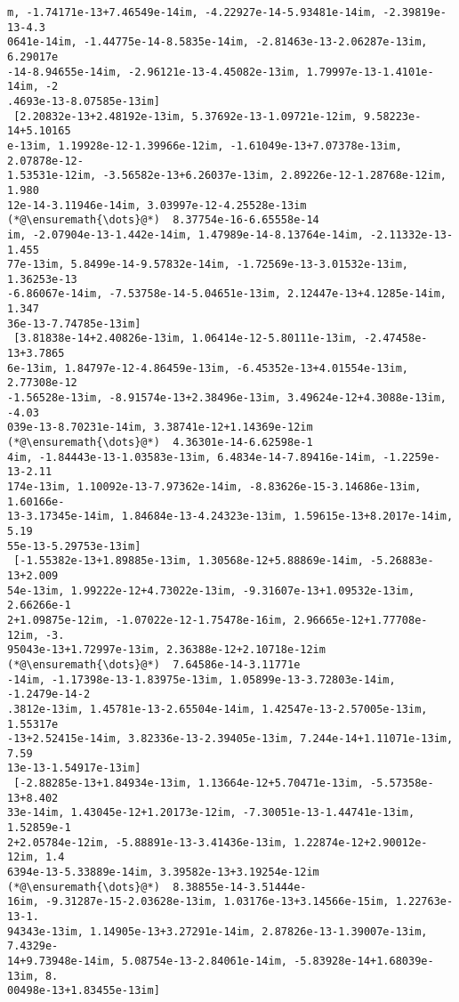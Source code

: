 \documentclass[12pt,a4paper]{article}
\begin{document}
\begin{lstlisting}
m, -1.74171e-13+7.46549e-14im, -4.22927e-14-5.93481e-14im, -2.39819e-13-4.3
0641e-14im, -1.44775e-14-8.5835e-14im, -2.81463e-13-2.06287e-13im, 6.29017e
-14-8.94655e-14im, -2.96121e-13-4.45082e-13im, 1.79997e-13-1.4101e-14im, -2
.4693e-13-8.07585e-13im]     
 [2.20832e-13+2.48192e-13im, 5.37692e-13-1.09721e-12im, 9.58223e-14+5.10165
e-13im, 1.19928e-12-1.39966e-12im, -1.61049e-13+7.07378e-13im, 2.07878e-12-
1.53531e-12im, -3.56582e-13+6.26037e-13im, 2.89226e-12-1.28768e-12im, 1.980
12e-14-3.11946e-14im, 3.03997e-12-4.25528e-13im  (*@\ensuremath{\dots}@*)  8.37754e-16-6.65558e-14
im, -2.07904e-13-1.442e-14im, 1.47989e-14-8.13764e-14im, -2.11332e-13-1.455
77e-13im, 5.8499e-14-9.57832e-14im, -1.72569e-13-3.01532e-13im, 1.36253e-13
-6.86067e-14im, -7.53758e-14-5.04651e-13im, 2.12447e-13+4.1285e-14im, 1.347
36e-13-7.74785e-13im]        
 [3.81838e-14+2.40826e-13im, 1.06414e-12-5.80111e-13im, -2.47458e-13+3.7865
6e-13im, 1.84797e-12-4.86459e-13im, -6.45352e-13+4.01554e-13im, 2.77308e-12
-1.56528e-13im, -8.91574e-13+2.38496e-13im, 3.49624e-12+4.3088e-13im, -4.03
039e-13-8.70231e-14im, 3.38741e-12+1.14369e-12im  (*@\ensuremath{\dots}@*)  4.36301e-14-6.62598e-1
4im, -1.84443e-13-1.03583e-13im, 6.4834e-14-7.89416e-14im, -1.2259e-13-2.11
174e-13im, 1.10092e-13-7.97362e-14im, -8.83626e-15-3.14686e-13im, 1.60166e-
13-3.17345e-14im, 1.84684e-13-4.24323e-13im, 1.59615e-13+8.2017e-14im, 5.19
55e-13-5.29753e-13im]        
 [-1.55382e-13+1.89885e-13im, 1.30568e-12+5.88869e-14im, -5.26883e-13+2.009
54e-13im, 1.99222e-12+4.73022e-13im, -9.31607e-13+1.09532e-13im, 2.66266e-1
2+1.09875e-12im, -1.07022e-12-1.75478e-16im, 2.96665e-12+1.77708e-12im, -3.
95043e-13+1.72997e-13im, 2.36388e-12+2.10718e-12im  (*@\ensuremath{\dots}@*)  7.64586e-14-3.11771e
-14im, -1.17398e-13-1.83975e-13im, 1.05899e-13-3.72803e-14im, -1.2479e-14-2
.3812e-13im, 1.45781e-13-2.65504e-14im, 1.42547e-13-2.57005e-13im, 1.55317e
-13+2.52415e-14im, 3.82336e-13-2.39405e-13im, 7.244e-14+1.11071e-13im, 7.59
13e-13-1.54917e-13im]        
 [-2.88285e-13+1.84934e-13im, 1.13664e-12+5.70471e-13im, -5.57358e-13+8.402
33e-14im, 1.43045e-12+1.20173e-12im, -7.30051e-13-1.44741e-13im, 1.52859e-1
2+2.05784e-12im, -5.88891e-13-3.41436e-13im, 1.22874e-12+2.90012e-12im, 1.4
6394e-13-5.33889e-14im, 3.39582e-13+3.19254e-12im  (*@\ensuremath{\dots}@*)  8.38855e-14-3.51444e-
16im, -9.31287e-15-2.03628e-13im, 1.03176e-13+3.14566e-15im, 1.22763e-13-1.
94343e-13im, 1.14905e-13+3.27291e-14im, 2.87826e-13-1.39007e-13im, 7.4329e-
14+9.73948e-14im, 5.08754e-13-2.84061e-14im, -5.83928e-14+1.68039e-13im, 8.
00498e-13+1.83455e-13im]
\end{lstlisting}
\end{document}
